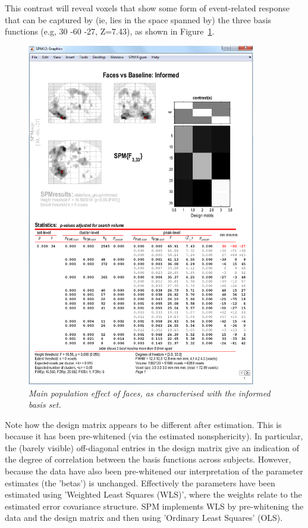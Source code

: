 This contrast will reveal voxels that show some form of event-related response that can be captured by (ie, lies in the space spanned by) the three basis functions (e.g, 30 -60 -27, Z=7.43), as shown in Figure~\ref{informed_results}.
\begin{figure}
\begin{center}
\includegraphics[width=100mm]{faces_group/informed_results}
\caption{\em Main population effect of faces, as characterised with the informed basis set. \label{informed_results}}
\end{center}
\end{figure}

Note how the design matrix appears to be different after estimation. This is because it has been pre-whitened (via the estimated nonsphericity). In particular, the (barely visible) off-diagonal entries in the design matrix give an indication of the degree of correlation between the basis functions across subjects. However, because the data have also been pre-whitened our interpretation of the parameter estimates (the 'betas') is unchanged. Effectively the parameters have been estimated using 'Weighted Least Squares (WLS)', where the weights relate to the estimated error covariance structure. SPM implements WLS by pre-whitening the data and the design matrix and then using 'Ordinary Least Squares' (OLS).

